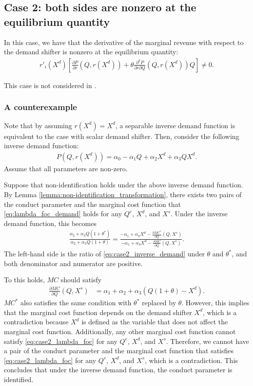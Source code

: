 \documentclass[11pt, a4paper]{article}
\theoremstyle{remark}
\begin{document}
\subsection{Case 2: both sides are nonzero at the equilibrium quantity}
In this case, we have that the derivative of the marginal revenue with respect to the demand shifter is nonzero at the equilibrium quantity:
\begin{align}
    r'_i(X^{d})\left[\frac{\partial P}{\partial r}(Q, r(X^{d})) + \theta\frac{\partial^2 P}{\partial r\partial Q}(Q, r(X^{d}))Q\right] \ne 0.
\end{align}

This case is not considered in \citet{lau1982identifying}.


\subsubsection{A counterexample}

Note that by assuming $r(X^{d}) = X^{d}$, a separable inverse demand function is equivalent to the case with scalar demand shifter.
Then, consider the following inverse demand function:
\begin{align}
    P(Q, r(X^{d})) = \alpha_0 - \alpha_1 Q + \alpha_2 X^{d} + \alpha_3 QX^{d}.\label{eq:case2_inverse_demand}
\end{align}
Assume that all parameters are non-zero.

Suppose that non-identification holds under the above inverse demand function.
By Lemma \ref{lemma:non-identification_transformation}, there exists two pairs of the conduct parameter and the marginal cost function that \eqref{eq:lambda_foc_demand} holds for any $Q^e$, $X^{d}$, and $X^{s}$.
Under the inverse demand function, this becomes
\begin{align}
    \frac{\alpha_2 + \alpha_3 Q (1 + \theta^{*})}{\alpha_2 + \alpha_3 Q (1 + \theta)} = \frac{-\alpha_1 + \alpha_3 X^{d} - \frac{\partial MC^{*}}{\partial Q}(Q, X^{s})}{-\alpha_1 + \alpha_3 X^{d} - \frac{\partial MC}{\partial Q}(Q, X^{s})}.\label{eq:case2_lambda_foc}
\end{align}
The left-hand side is the ratio of \eqref{eq:case2_inverse_demand} under $\theta$ and $\theta^{*}$, and both denominator and numerator are positive.

To this holds, $MC$ should satisfy
\begin{align}
    \frac{\partial MC}{\partial Q}(Q, X^{s}) & = \alpha_1 + \alpha_2 + \alpha_3 (Q(1 + \theta) - X^{d}). 
\end{align}
$MC^{*}$ also satisfies the same condition with $\theta^{*}$ replaced by $\theta$.
However, this implies that the marginal cost function depends on the demand shifter $X^{d}$, which is a contradiction because $X^{d}$ is defined as the variable that does not affect the marginal cost function.
Additionally, any other marginal cost function cannot satisfy \eqref{eq:case2_lambda_foc} for any $Q^e$, $X^{d}$, and $X^{s}$.
Therefore, we cannot have a pair of the conduct parameter and the marginal cost function that satisfies \eqref{eq:case2_lambda_foc} for any $Q^e$, $X^{d}$, and $X^{s}$, which is a contradiction.
This concludes that under the inverse demand function, the conduct parameter is identified.
\end{document}
